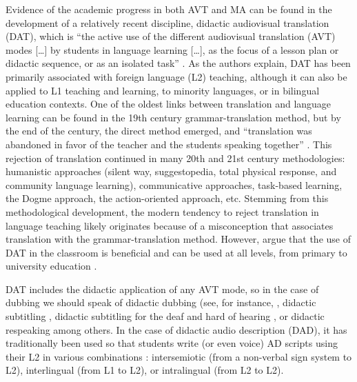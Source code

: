 \documentclass[english]{textolivre}
\begin{document}
Evidence of the academic progress in both AVT and MA can be found in the development of a relatively recent discipline, didactic audiovisual translation (DAT), which is “the active use of the different audiovisual translation (AVT) modes […] by students in language learning […], as the focus of a lesson plan or didactic sequence, or as an isolated task” \cite[p. 1]{talavan_lertola_fernandez-costales2024}. As the authors explain, DAT has been primarily associated with foreign language (L2) teaching, although it can also be applied to L1 teaching and learning, to minority languages, or in bilingual education contexts. One of the oldest links between translation and language learning can be found in the 19th century grammar-translation method, but by the end of the century, the direct method emerged, and “translation was abandoned in favor of the teacher and the students speaking together” \cite[p. 56]{harmer2019}. This rejection of translation continued in many 20th and 21st century methodologies: humanistic approaches (silent way, suggestopedia, total physical response, and community language learning), communicative approaches, task-based learning, the Dogme approach, the action-oriented approach, etc. Stemming from this methodological development, the modern tendency to reject translation in language teaching likely originates because of a misconception that associates translation with the grammar-translation method. However, \textcite{talavan_lertola_fernandez-costales2024} argue that the use of DAT in the classroom is beneficial and can be used at all levels, from primary to university education \cite{talavan_lertola_fernandez-costales2024}.

DAT includes the didactic application of any AVT mode, so in the case of dubbing we should speak of didactic dubbing (see, for instance, \textcite{navarrete2013,talavan2013,talavan_costal2017,sanchez-requena2018}, didactic subtitling \textcite{borghetti2014,vanderplank2016,fernandez-costales2017,avila-cabrera2018,diaz-cintas2018a,sokoli2018,talavan2020}, didactic subtitling for the deaf and hard of hearing \cite{agullo2019, talavan2019, garcia-munoz_vizcaino2024}, or didactic respeaking \cite{belenguer-cortes2024} among others. In the case of didactic audio description (DAD), it has traditionally been used so that students write (or even voice) AD scripts using their L2 in various combinations \cite{talavan_lertola_fernandez-costales2024}: intersemiotic (from a non-verbal sign system to L2), interlingual (from L1 to L2), or intralingual (from L2 to L2). 
\end{document}
